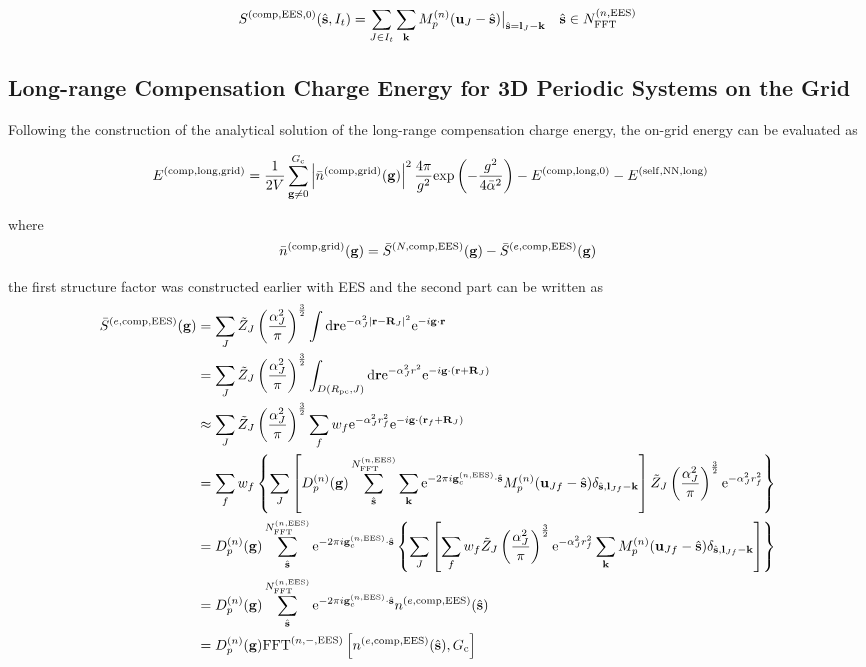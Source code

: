 \documentclass[paper=a4, fontsize=11pt]{article} %
\numberwithin{equation}{section} %
\numberwithin{figure}{section} %
\numberwithin{table}{section} %
\newcommand{\bu}{{\bf{u}}}
\newcommand{\bl}{{\bf{l}}}
\newcommand{\bk}{{\bf{k}}}
\newcommand{\bs}{{\bf{s}}}
\newcommand{\bg}{{\bf{g}}}
\newcommand{\br}{{\bf{r}}}
\newcommand{\bR}{{\bf{R}}}
\newcommand{\hs}{{\hat{\bf{s}}}}
\newcommand{\rexp}{{\mathrm{exp}}}
\newcommand{\rEES}{{\mathrm{EES}}}
\newcommand{\rNN}{{\mathrm{NN}}}
\newcommand{\rself}{{\mathrm{self}}}
\newcommand{\re}{{\mathrm{e}}}
\newcommand{\rlong}{{\mathrm{long}}}
\newcommand{\rd}{{\mathrm{d}}}
\newcommand{\rcomp}{{\mathrm{comp}}}
\newcommand{\rgrid}{{\mathrm{grid}}}
\newcommand{\ibgr}{i\bg\cdot\br}
\newcommand{\gcnEES}{{\bg_c^{(n,\rEES)}}}
\newcommand{\al}{{\alpha}}
\newcommand{\NFFTnEES}{{N^{(n,\rEES)}_{\mathrm{FFT}}}}
\newcommand{\Gc}{{G_{\mathrm{c}}}}
\newcommand{\Rpc}{{R_{\mathrm{pc}}}}
\newcommand{\Dng}{{D^{(n)}_p(\bg)}}
\newcommand{\FFTniEES}{{\mathrm{FFT}^{(n,-,\rEES)}}}
\newcommand{\bal}{{\bar{\alpha}}}
\begin{document}
\begin{equation}
\begin{split}
S^{(\rcomp,\rEES,0)}(\hs,I_t) &=\sum_{J\in I_t}\sum_{\bk}  M_p^{(n)}(\bu_{J}-\hat \bs)\big|_{\hs=\bl_{J}-\bk}\ \ \  \hs \in \NFFTnEES\\
\end{split}
\end{equation}


\subsection{Long-range Compensation Charge Energy for 3D Periodic Systems on the Grid}
Following the construction of the analytical solution of the long-range compensation charge energy, the on-grid energy can be evaluated as

\begin{equation}
\begin{split}
E^{(\rcomp,\rlong,\rgrid)} 
&= \frac{1}{2V} \sum_{\bg \neq 0}^{\Gc} \left|\bar n ^{(\rcomp,\rgrid)}(\bg)\right|^2 \frac{4\pi}{g^2} \rexp\left(-\frac{g^2}{4\bal^2}\right) - E^{(\rcomp,\rlong,0)} - E^{(\rself,\rNN,\rlong)}
\end{split}
\end{equation}

where
\begin{equation}
\bar n ^{(\rcomp,\rgrid)}(\bg)
= \bar S^{(N,\rcomp,\rEES)}(\bg) - \bar S^{(e,\rcomp,\rEES)}(\bg)
\end{equation}

the first structure factor was constructed earlier with EES and the second part can be written as
\begin{equation}
\begin{split}
\bar S^{(e,\rcomp,\rEES)}(\bg)
&=  \sum_J \tilde Z_J \left(\frac{\al_J^2}{\pi}\right)^{\frac{3}{2}} \int \rd \br \re^{-\al_J^2|\br-\bR_J|^2} \re^{-\ibgr}\\
&=  \sum_J \tilde Z_J \left(\frac{\al_J^2}{\pi}\right)^{\frac{3}{2}} \int_{D(\Rpc,J)} \rd \br \re^{-\al_J^2 r^2} \re^{-i\bg\cdot\left(\br+\bR_J\right)}\\
&\approx \sum_J \tilde Z_J \left(\frac{\al_J^2}{\pi}\right)^{\frac{3}{2}} \sum_f w_f \re^{-\al_J^2 r_f^2} \re^{-i\bg\cdot\left(\br_f+\bR_J\right)}\\
&=  \sum_f w_f \left\{\sum_J \left[\Dng\sum_{\hs}^{\NFFTnEES} \sum_{\bk} \re^{-2\pi i\gcnEES \cdot \hs} M_p^{(n)}(\bu_{Jf}-\hs)\delta_{\hat \bs,\bl_{Jf}-\bk}\right]  \tilde Z_J \left(\frac{\al_J^2}{\pi}\right)^{\frac{3}{2}} \re^{-\al_J^2 r_f^2} \right\} \\
 &= D_p^{(n)}(\bg)\sum_{\hat \bs}^{\NFFTnEES} \re^{-2\pi i\gcnEES \cdot \hat\bs}\left\{\sum_J \left[ \sum_f w_f \tilde Z_J \left(\frac{\al_J^2}{\pi}\right)^{\frac{3}{2}} \re^{-\al_J^2 r_f^2} \sum_{\bk}  M_p^{(n)}(\bu_{Jf}-\hat \bs)\delta_{\hat \bs,\bl_{Jf}-\bk}\right] \right\}\\
 &= D_p^{(n)}(\bg)\sum_{\hat \bs}^{\NFFTnEES} \re^{-2\pi i\gcnEES \cdot \hat\bs} n^{(e,\rcomp,\rEES)}(\hs)\\
 &= \Dng \FFTniEES \left[ n^{(e,\rcomp,\rEES)}(\hs), \Gc \right]
\end{split}
\end{equation}
\end{document}
